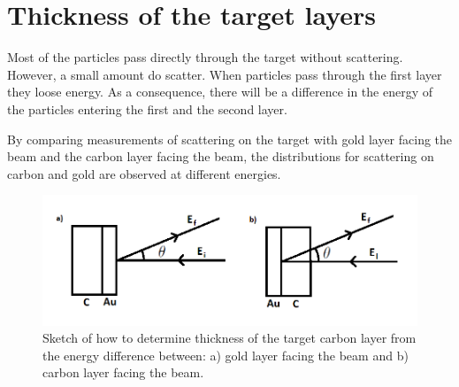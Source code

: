 \section{Thickness of the target layers} 
Most of the particles pass directly through the target without scattering. However, a small amount do scatter. When particles pass through the first layer they loose energy. As a consequence, there will be a difference in the energy of the particles entering the first and the second layer. 

By comparing measurements of scattering on the target with gold layer facing the beam and the carbon layer facing the beam, the distributions for scattering on carbon and gold are observed at different energies. 

\begin{figure}[h]
\centering
\includegraphics[width=0.99\columnwidth]{tykkelse.png}
\caption{Sketch of how to determine thickness of the target carbon layer from the energy difference between: a) gold layer facing the beam and b) carbon layer facing the beam.}
\label{fig_sketch_thickness}
\end{figure}


